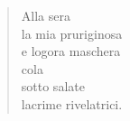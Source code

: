 
\begin{verse}
    Alla sera\\
    la mia pruriginosa\\
    e logora maschera\\
    cola\\
    sotto salate\\
    lacrime rivelatrici.
\end{verse}